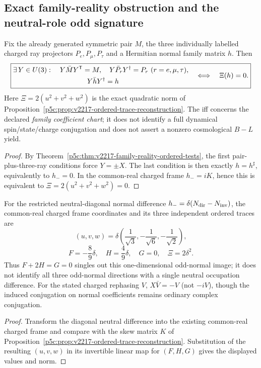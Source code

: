 \documentclass[12pt,a4paper]{article}
\begin{document}
\subsection{Exact family-reality obstruction and the neutral-role odd signature}
\label{p5c:sec:v229-complete-family-reality}

\begin{corollary}
\label{p5c:cor:v229-complete-family-reality-obstruction}
Fix the already generated symmetric pair $M$, the three individually
labelled charged ray projectors $P_e,P_\mu,P_\tau$ and a Hermitian normal
family matrix $h$.  Then
\[
 \boxed{\begin{aligned}
 &\exists\,Y\in U(3):\quad
   Y\bar M Y^{\mathsf T}=M,\quad
   Y\bar P_rY^\dagger=P_r\ (r=e,\mu,\tau),\\
 &\hspace{37mm}Y\bar hY^\dagger=h
 \end{aligned}
 \quad\Longleftrightarrow\quad\Xi(h)=0.}
\]
Here $\Xi=2(u^2+v^2+w^2)$ is the exact quadratic norm of
Proposition~\ref{p5c:prop:v2217-ordered-trace-reconstruction}.
The iff concerns the declared \emph{family coefficient chart}; it does
not identify a full dynamical spin/state/charge conjugation and does not
assert a nonzero cosmological $B-L$ yield.
\end{corollary}
\begin{proof}
By Theorem~\ref{p5c:thm:v2217-family-reality-ordered-tests},
the first pair-plus-three-ray conditions force $Y=\pm X$.
The last condition is then exactly $h=h^\sharp$, equivalently to
$h_-=0$.  In the common-real charged frame $h_-=iK$, hence this
is equivalent to $\Xi=2(u^2+v^2+w^2)=0$.
\end{proof}

\begin{corollary}
\label{p5c:cor:v229-neutral-gap-odd-trace-signature}
For the restricted neutral-diagonal normal difference
$h_-=\delta(N_{\rm dir}-N_{\rm inv})$, the common-real charged frame
coordinates and its three independent ordered traces are
\[
 \boxed{(u,v,w)=\delta\left(\frac1{\sqrt3},
 -\frac1{\sqrt6},-\frac1{\sqrt2}\right),}
\]
\[
 \boxed{F=-\frac89\delta,\quad H=\frac49\delta,\quad
 G=0,\quad\Xi=2\delta^2.}
\]
Thus $F+2H=G=0$ singles out this one-dimensional odd-normal image;
it does not identify all three odd-normal directions with a single
neutral occupation difference.  For the stated charged rephasing $V$,
$X\bar V=-V$ (not $-iV$), though the induced conjugation on normal
coefficients remains ordinary complex conjugation.
\end{corollary}
\begin{proof}
Transform the diagonal neutral difference into the existing common-real
charged frame and compare with the skew matrix $K$ of
Proposition~\ref{p5c:prop:v2217-ordered-trace-reconstruction}.
Substitution of the resulting $(u,v,w)$ in its invertible linear map
for $(F,H,G)$ gives the displayed values and norm.
\end{proof}
\end{document}
